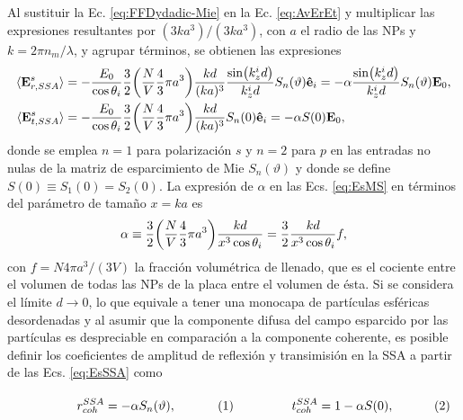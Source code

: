Al sustituir la Ec. \eqref{eq:FFDydadic-Mie} en la Ec. \eqref{eq:AvErEt} y multiplicar las expresiones resultantes por $(3ka^3)/(3ka^3)$, con $a$ el radio de las NPs y $k = 2\pi n_m /\lambda$, y agrupar términos, se obtienen las expresiones 
	\begin{subequations}\begin{align}
		\langle \vb{E}^s_{r,SSA}\rangle & = - \frac{E_0}{\cos\theta_i} \frac32  \qty(\frac{N}{V} \frac43\pi a^3)\frac{kd}{(ka)^3}   \frac{\sin(k_z^id)}{k_z^i d}  S_n(\vartheta)\vu{e}_i =
		-\alpha  \frac{\sin(k_z^id)}{k_z^i d}   S_n(\vartheta) \vb{E}_0,
		\label{eqs:EsSSAr}\\
	\langle \vb{E}^s_{t,SSA}\rangle &=  - \frac{E_0}{\cos\theta_i} \frac32
						 \qty(\frac{N}{V}\frac43\pi a^3  ) \frac{kd}{(ka)^3}  S_n(0) \vu{e}_i  
						 = - \alpha S(0) \vb{E}_0,
		\label{eqs:EsSSAt}
	\end{align}\label{eq:EsSSA}\end{subequations}
donde  se emplea $n=1$ para polarización $s$ y $n=2$ para $p$ en las entradas no nulas de la matriz de esparcimiento de Mie $S_n(\vartheta)$ y donde se define $S(0) \equiv S_1(0)=S_2(0)$. La expresión de $\alpha$ en las Ecs. \eqref{eq:EsMS} en términos del parámetro de tamaño $x=ka$ es
\begin{align*}
	\alpha \equiv \frac32 \qty(\frac{N}{V}\frac43 \pi a^3  )\frac{kd}{x^3\cos\theta_i} = \frac32\frac{kd}{ x^3\cos\theta_i} f,
	\end{align*}
con $f= N 4\pi a^3/(3V)$ la fracción volumétrica de llenado, que es el cociente entre el volumen de todas las NPs de la placa entre el volumen de ésta. Si se considera el límite $d\to 0$, lo que equivale a tener una monocapa de partículas esféricas desordenadas y al asumir que la componente difusa del campo esparcido por las partículas es despreciable en comparación a la componente coherente, es posible definir los coeficientes de amplitud de reflexión y transimisión en la SSA a partir de las Ecs. \eqref{eq:EsSSA} como
	
	\begin{subequations}\eqhalf{r_{coh}^{SSA} = -\alpha S_n(\vartheta),}
	\eqhalf{t_{coh}^{SSA} = 1 - \alpha S(0), }
	\label{eqs:rtcohSSA}\end{subequations}\vspace*{-1em}	
	
